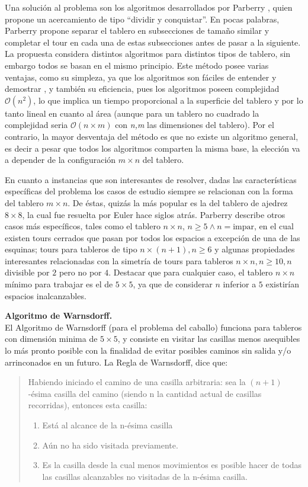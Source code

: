 \documentclass[journal, 10pt]{IEEEtran}
\begin{document}
Una solución al problema son los algoritmos desarrollados por Parberry \cite{Parberry:1997}, quien propone un acercamiento de tipo “dividir y conquistar”. En pocas palabras, Parberry propone separar el tablero en subsecciones de tamaño similar y completar el tour en cada una de estas subsecciones antes de pasar a la siguiente. La propuesta considera distintos algoritmos para distintos tipos de tablero, sin embargo todos se basan en el mismo principio. Este método posee varias ventajas, como su simpleza, ya que los algoritmos son fáciles de entender y demostrar \cite{Parberry:1997}, y también su eficiencia, pues los algoritmos poseen complejidad $\mathcal{O}(n^2)$, lo que implica un tiempo proporcional a la superficie del tablero y por lo tanto lineal en cuanto al área (aunque para un tablero no cuadrado la complejidad seria $\mathcal{O}(n\times m) $ con \textit{n,m} las dimensiones del tablero). Por el contrario, la mayor desventaja del método es que no existe un algoritmo general, es decir a pesar que todos los algoritmos comparten la misma base, la elección va a depender de la configuración $m\times n$ del tablero.

En cuanto a instancias que son interesantes de resolver, dadas las características específicas del problema los casos de estudio siempre se relacionan con la forma del tablero $m \times n$. De éstas, quizás la más popular es la del tablero de ajedrez $8 \times 8$, la cual fue resuelta por Euler \cite{Euler:1759} hace siglos atrás. Parberry \cite{Parberry:1997} describe otros casos más específicos, tales como el tablero $n \times n$, $n \ge 5 \wedge n=\text{impar}$, en el cual existen tours cerrados que pasan por todos los espacios a excepción de una de las esquinas; tours para tableros de tipo $n \times (n+1), n \ge 6$ y algunas propiedades interesantes relacionadas con la simetría de tours para tableros $n \times n, n \ge 10, n$ divisible por $2$ pero no por $4$. Destacar que para cualquier caso, el tablero $n \times n$ mínimo para trabajar es el de $5\times 5$, ya que de considerar $n$ inferior a $5$ existirían espacios inalcanzables.

\textbf{Algoritmo de Warnsdorff.}\\
El Algoritmo de Warnsdorff (para el problema del caballo) funciona para tableros con dimensión minima de $5\times 5$, y consiste en visitar las casillas menos asequibles lo más pronto posible con la finalidad de evitar posibles caminos sin salida y/o arrinconados en un futuro. La Regla de Warnsdorff\cite{Squirrel:1996}, dice que:
\begin{quote}
	Habiendo iniciado el camino de una casilla arbitraria: sea la $(n+1)$-ésima casilla del camino (siendo n la cantidad actual de casillas recorridas), entonces esta casilla:
	\begin{enumerate}
		\item Está al alcance de la n-ésima casilla
		\item Aún no ha sido visitada previamente.
		\item Es la casilla desde la cual menos movimientos es posible hacer de todas las casillas alcanzables no visitadas de la n-ésima casilla.
\end{enumerate}
\end{quote}
\end{document}

